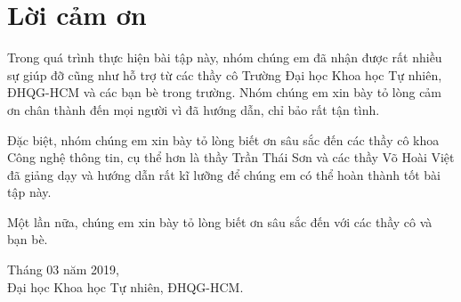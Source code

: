 \cleardoublepage
{}
{}
\section*{Lời cảm ơn}
\vspace{1.0in}
\begingroup
\setlength{\parindent}{0pt}
Trong quá trình thực hiện bài tập này, nhóm chúng em đã nhận được rất nhiều sự giúp đỡ cũng như hỗ trợ từ các thầy cô Trường Đại học Khoa học Tự nhiên, ĐHQG-HCM và các bạn bè trong trường. Nhóm chúng em xin bày tỏ lòng cảm ơn chân thành đến mọi người vì đã hướng dẫn, chỉ bảo rất tận tình.

Đặc biệt, nhóm chúng em xin bày tỏ lòng biết ơn sâu sắc đến các thầy cô khoa Công nghệ thông tin, cụ thể hơn là thầy Trần Thái Sơn và các thầy Võ Hoài Việt đã giảng dạy và hướng dẫn rất kĩ lưỡng để chúng em có thể hoàn thành tốt bài tập này.\par

Một lần nữa, chúng em xin bày tỏ lòng biết ơn sâu sắc đến với các thầy cô và bạn bè.\par

Tháng 03 năm 2019,\\
{Đại học Khoa học Tự nhiên, ĐHQG-HCM.}\\
\endgroup
\newpage
